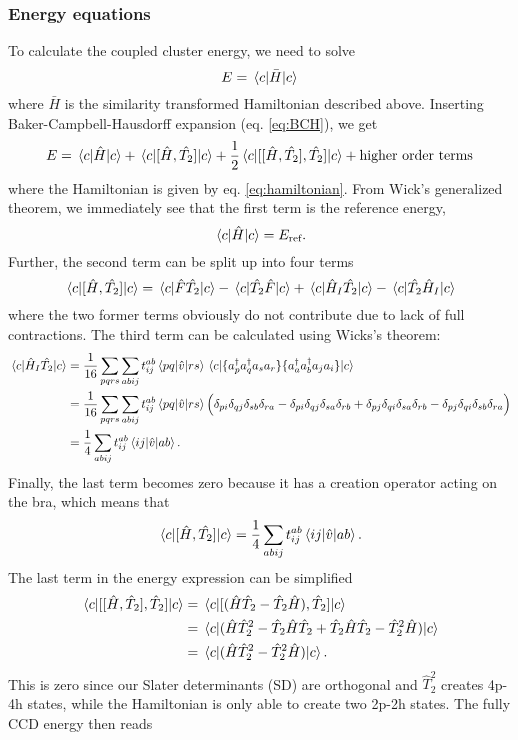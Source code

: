 \documentclass[a4paper,12pt]{article}
\newcommand{\hatH}{\hat{H}}
\newcommand{\hatTt}{\hat{T}_2}
\newcommand{\brak}[2]{\mel{#1}{\hat{v}}{#2}}
\begin{document}
\subsubsection{Energy equations} \label{sec:energy}
To calculate the coupled cluster energy, we need to solve
\begin{equation}
    E=\mel{c}{\bar{H}}{c}
    \label{eq:ccenergy}
\end{equation}
where $\bar{H}$ is the similarity transformed Hamiltonian described above. Inserting Baker-Campbell-Hausdorff expansion (eq. \ref{eq:BCH}), we get
\begin{equation}
    E=\mel{c}{\hat{H}}{c}+\mel{c}{[\hatH,\hat{T_2}]}{c}+\frac{1}{2}\mel{c}{[[\hatH,\hat{T_2}],\hat{T_2}]}{c}+\text{higher order terms}
\end{equation}
where the Hamiltonian is given by eq. \ref{eq:hamiltonian}.
From Wick's generalized theorem, we immediately see that the first term is the reference energy,
\begin{equation}
    \mel{c}{\hat{H}}{c}=E_{\text{ref}}.
\end{equation}
Further, the second term can be split up into four terms
\begin{equation}
    \mel{c}{[\hatH,\hat{T_2}]}{c}=\mel{c}{\hat{F}\hat{T_2}}{c}-\mel{c}{\hat{T_2}\hat{F}}{c}+\mel{c}{\hat{H}_I\hat{T_2}}{c}-\mel{c}{\hat{T_2}\hat{H}_I}{c}
\end{equation}
where the two former terms obviously do not contribute due to lack of full contractions. The third term can be calculated using Wicks's theorem:
\begin{align}
    \mel{c}{\hat{H}_I\hat{T_2}}{c}&=\frac{1}{16}\sum_{pqrs}\sum_{abij}t_{ij}^{ab}\brak{pq}{rs}\mel{c}{\{a_p^{\dagger}a_q^{\dagger}a_sa_r\}\{a_a^{\dagger}a_b^{\dagger}a_ja_i\}}{c}\\
    &=\frac{1}{16}\sum_{pqrs}\sum_{abij}t_{ij}^{ab}\brak{pq}{rs}\Big(\delta_{pi}\delta_{qj}\delta_{sb}\delta_{ra}-\delta_{pi}\delta_{qj}\delta_{sa}\delta_{rb}+\delta_{pj}\delta_{qi}\delta_{sa}\delta_{rb}-\delta_{pj}\delta_{qi}\delta_{sb}\delta_{ra}\Big)\\
    &=\frac{1}{4}\sum_{abij}t_{ij}^{ab}\brak{ij}{ab}.
\end{align}
Finally, the last term becomes zero because it has a creation operator acting on the bra, which means that 
\begin{equation}
    \mel{c}{[\hatH,\hat{T_2}]}{c}=\frac{1}{4}\sum_{abij}t_{ij}^{ab}\brak{ij}{ab}.
\end{equation}
The last term in the energy expression can be simplified
\begin{align}
    \mel{c}{[[\hatH,\hat{T}_2], \hat{T}_2]}{c}&=\mel{c}{[(\hatH\hatTt-\hatTt\hatH),\hatTt]}{c}\notag\\
    &=\mel{c}{(\hatH\hatTt^2-\hatTt\hatH\hatTt+\hatTt\hatH\hatTt-\hatTt^2\hatH)}{c}\notag\\
    &=\mel{c}{(\hatH\hatTt^2-\hatTt^2\hatH)}{c}.
\end{align}
This is zero since our Slater determinants (SD) are orthogonal and $\hatTt^2$ creates 4p-4h states, while the Hamiltonian is only able to create two 2p-2h states. The fully CCD energy then reads
\end{document}
